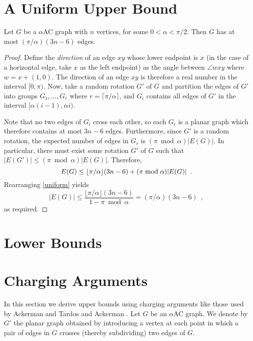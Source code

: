 \documentclass[lotsofwhite,charterfonts]{patmorin}
\begin{document}
\section{A Uniform Upper Bound}

\begin{thm}
Let $G$ be a $\alpha$AC graph with $n$ vertices, for some $0<\alpha<\pi/2$.
Then $G$ has at most $(\pi/\alpha)(3n-6)$ edges.
\end{thm}

\begin{proof}
Define the \emph{direction} of an edge $xy$ whose lower endpoint is $x$ (in
the case of a horizontal edge, take $x$ as the left endpoint) as the angle
between $\angle wxy$ where $w=x+(1,0)$.  The direction of an edge $xy$ is
therefore a real number in the interval $[0,\pi)$.  Now, take a random
rotation $G'$ of $G$ and partition the edges of $G'$ into groups
$G_1,\ldots,G_{r}$ where $r=\lceil\pi/\alpha\rceil$, and $G_i$ contains all
edges of $G'$ in the interval $[\alpha(i-1),\alpha i)$.

Note that no two edges of $G_i$ cross each other, so each $G_i$ is a planar
graph which therefore contains
at most $3n-6$ edges.  Furthermore, since $G'$ is a random rotation, the
expected number of edges in $G_{r}$ is $(\pi\bmod \alpha) |E(G)|$.  In
particular, there must exist some rotation $G'$ of $G$ such that $|E(G')|
\le (\pi\bmod \alpha) |E(G)|$.  Therefore,
\begin{equation}
   E(G) \le \lfloor \pi/\alpha \rfloor(3n-6) + (\pi\bmod\alpha)|E(G)| \enspace .
   \eqlabel{uniform}
\end{equation}
Rearranging \eqref{uniform} yields
\[  
  |E(G)| 
    \le  \frac{\lfloor \pi/\alpha \rfloor(3n-6)}{1-\pi\bmod\alpha} 
    = (\pi/\alpha)(3n-6) \enspace ,
\]
as required.
\end{proof}

\section{Lower Bounds}

\section{Charging Arguments}

In this section we derive upper bounds using charging arguments like those
used by Ackerman and Tardos \cite{atXX} and Ackerman \cite{atXX}.  Let $G$
be an $\alpha$AC graph.  We denote by $G'$ the planar graph obtained by
introducing a vertex at each point in which a pair of edges in $G$ crosses
(thereby subdividing) two edges of $G$.  
\end{document}

